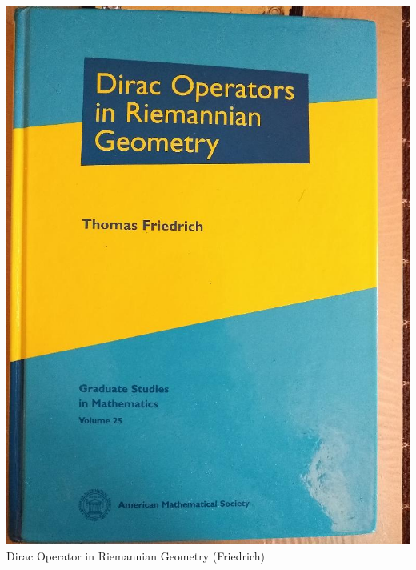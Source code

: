 \documentclass[t]{beamer}
\newcommand{\htarget}[2]{\hypertarget{#1}{#2}}
\begin{document}
\begin{frame}\htarget{DF}{} \begin{center}
\includegraphics[height=0.8\textheight]{Dirac_Operator_in_Riemannian_Geometry_mini.jpg} \\
Dirac Operator in Riemannian Geometry (Friedrich)
\end{center} \end{frame}
\end{document}
